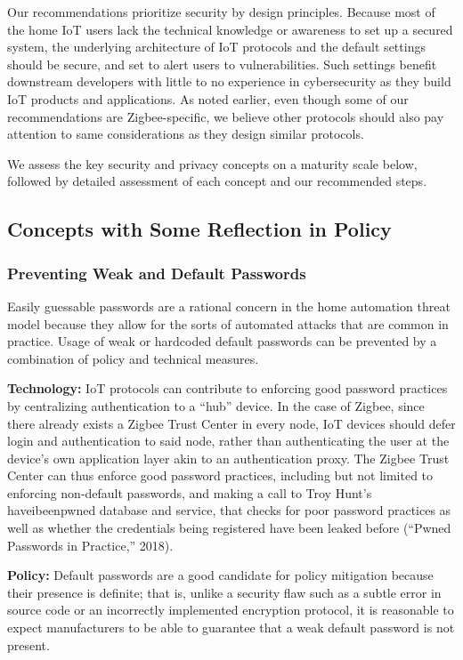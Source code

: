 Our recommendations prioritize security by design principles. Because most of the home IoT users lack the technical knowledge or awareness to set up a secured system, the underlying architecture of IoT protocols and the default settings should be secure, and set to alert users to vulnerabilities. Such settings benefit downstream developers with little to no experience in cybersecurity as they build IoT products and applications. As noted earlier, even though some of our recommendations are Zigbee-specific, we believe other protocols should also pay attention to same considerations as they design similar protocols.

We assess the key security and privacy concepts on a maturity scale below, followed by detailed assessment of each concept and our recommended steps.


\subsection{Concepts with Some Reflection in Policy}

\subsubsection{Preventing Weak and Default Passwords}
Easily guessable passwords are a rational concern in the home automation threat model because they allow for the sorts of automated attacks that are common in practice. Usage of weak or hardcoded default passwords can be prevented by a combination of policy and technical measures.

{\bf Technology:}  IoT protocols can contribute to enforcing good password practices by centralizing authentication to a “hub” device. In the case of Zigbee, since there already exists a Zigbee Trust Center in every node, IoT devices should defer login and authentication to said node, rather than authenticating the user at the device’s own application layer akin to an authentication proxy. The Zigbee Trust Center can thus enforce good password practices, including but not limited to enforcing non-default passwords, and making a call to Troy Hunt’s haveibeenpwned database and service, that checks for poor password practices as well as whether the credentials being registered have been leaked before (“Pwned Passwords in Practice,” 2018).

{\bf Policy:} Default passwords are a good candidate for policy mitigation because their presence is definite; that is, unlike a security flaw such as a subtle error in source code or an incorrectly implemented encryption protocol, it is reasonable to expect manufacturers to be able to guarantee that a weak default password is not present. 

